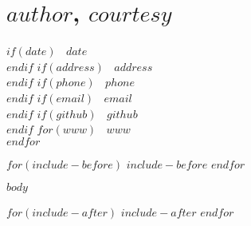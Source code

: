 \documentclass[$if(fontsize)$$fontsize$,$endif$$if(lang)$$lang$,$endif$$if(papersize)$$papersize$,$endif$$for(classoption)$$classoption$$sep$,$endfor$]{$documentclass$}
\begin{document}
\thispagestyle{empty}

\section{$author$, $courtesy$}\label{author}

$if(date)$
\textcolor{sectiongray}{\faCalendar} \(~\) $date$\\
$endif$
$if(address)$
\textcolor{sectiongray}{\faMap} \(~\) $address$\\
$endif$
$if(phone)$
\textcolor{sectiongray}{\faPhone} \(~\) $phone$\\
$endif$
$if(email)$
\textcolor{sectiongray}{\faEnvelope} \(~\) $email$\\
$endif$
$if(github)$
\textcolor{sectiongray}{\faGithub} \(~\) $github$\\
$endif$
$for(www)$
\textcolor{sectiongray}{\faGlobe} \(~\) $www$\\
$endfor$





$for(include-before)$
$include-before$
$endfor$

$body$

$for(include-after)$
$include-after$
$endfor$
\end{document}
